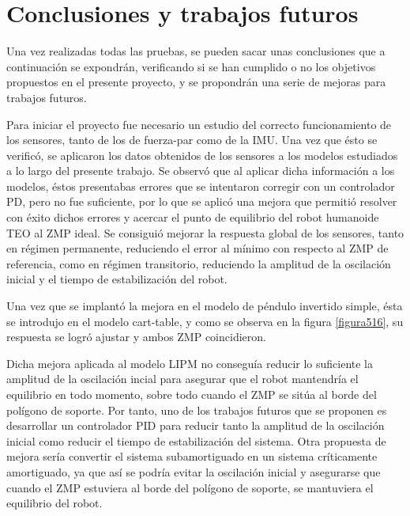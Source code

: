 \section{Conclusiones y trabajos futuros}

Una vez realizadas todas las pruebas, se pueden sacar unas conclusiones que a continuación se expondrán, verificando si se han cumplido o no los objetivos propuestos en el presente proyecto, y se propondrán una serie de mejoras para trabajos futuros.

Para iniciar el proyecto fue necesario un estudio del correcto funcionamiento de los sensores, tanto de los de fuerza-par como de la IMU. Una vez que ésto se verificó, se aplicaron los datos obtenidos de los sensores a los modelos estudiados a lo largo del presente trabajo. Se observó que al aplicar dicha información a los modelos, éstos presentabas errores que se intentaron corregir con un controlador PD, pero no fue suficiente, por lo que se aplicó una mejora que permitió resolver con éxito dichos errores y acercar el punto de equilibrio del robot humanoide TEO al ZMP ideal. Se consiguió mejorar la respuesta global de los sensores, tanto en régimen permanente, reduciendo el error al mínimo con respecto al ZMP de referencia, como en régimen transitorio, reduciendo la amplitud de la oscilación inicial y el tiempo de estabilización del robot.

Una vez que se implantó la mejora en el modelo de péndulo invertido simple, ésta se introdujo en el modelo cart-table, y como se observa en la figura \ref{figura516}, su respuesta se logró ajustar y ambos ZMP coincidieron.

Dicha mejora aplicada al modelo LIPM no conseguía reducir lo suficiente la amplitud de la oscilación incial para asegurar que el robot mantendría el equilibrio en todo momento, sobre todo cuando el ZMP se sitúa al borde del polígono de soporte. Por tanto, uno de los trabajos futuros que se proponen es desarrollar un controlador PID para reducir tanto la amplitud de la oscilación inicial como reducir el tiempo de estabilización del sistema. Otra propuesta de mejora sería convertir el sistema subamortiguado en un sistema críticamente amortiguado, ya que así se podría evitar la oscilación inicial y asegurarse que cuando el ZMP estuviera al borde del polígono de soporte, se mantuviera el equilibrio del robot.


\afterpage{\null\newpage}
\newpage
